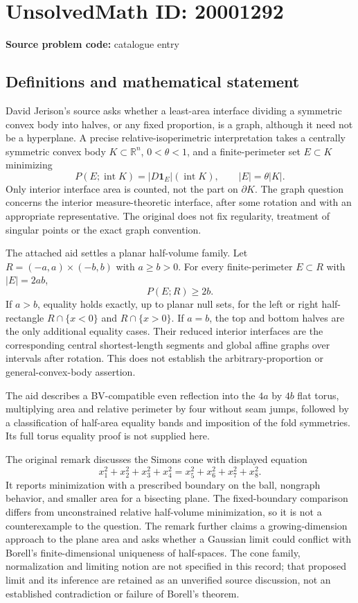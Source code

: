 \documentclass[11pt]{article}
\newcommand{\R}{\mathbb{R}}
\begin{document}
\section*{UnsolvedMath ID: 20001292}
\textbf{Source problem code:} catalogue entry
\subsection{Definitions and mathematical statement}
David Jerison's source asks whether a least-area interface dividing a symmetric convex body into halves, or any fixed proportion, is a graph, although it need not be a hyperplane. A precise relative-isoperimetric interpretation takes a centrally symmetric convex body $K\subset\R^n$, $0<\theta<1$, and a finite-perimeter set $E\subset K$ minimizing
\[
P(E;\operatorname{int}K)=|D\mathbf1_E|(\operatorname{int}K),\qquad |E|=\theta|K|.
\]
Only interior interface area is counted, not the part on $\partial K$. The graph question concerns the interior measure-theoretic interface, after some rotation and with an appropriate representative. The original does not fix regularity, treatment of singular points or the exact graph convention.

The attached aid settles a planar half-volume family. Let $R=(-a,a)\times(-b,b)$ with $a\ge b>0$. For every finite-perimeter $E\subset R$ with $|E|=2ab$,
\[
P(E;R)\ge2b.
\]
If $a>b$, equality holds exactly, up to planar null sets, for the left or right half-rectangle $R\cap\{x<0\}$ and $R\cap\{x>0\}$. If $a=b$, the top and bottom halves are the only additional equality cases. Their reduced interior interfaces are the corresponding central shortest-length segments and global affine graphs over intervals after rotation. This does not establish the arbitrary-proportion or general-convex-body assertion.

The aid describes a BV-compatible even reflection into the $4a$ by $4b$ flat torus, multiplying area and relative perimeter by four without seam jumps, followed by a classification of half-area equality bands and imposition of the fold symmetries. Its full torus equality proof is not supplied here.

The original remark discusses the Simons cone with displayed equation
\[
x_1^2+x_2^2+x_3^2+x_4^2=x_5^2+x_6^2+x_7^2+x_8^2.
\]
It reports minimization with a prescribed boundary on the ball, nongraph behavior, and smaller area for a bisecting plane. The fixed-boundary comparison differs from unconstrained relative half-volume minimization, so it is not a counterexample to the question. The remark further claims a growing-dimension approach to the plane area and asks whether a Gaussian limit could conflict with Borell's finite-dimensional uniqueness of half-spaces. The cone family, normalization and limiting notion are not specified in this record; that proposed limit and its inference are retained as an unverified source discussion, not an established contradiction or failure of Borell's theorem.
\end{document}
